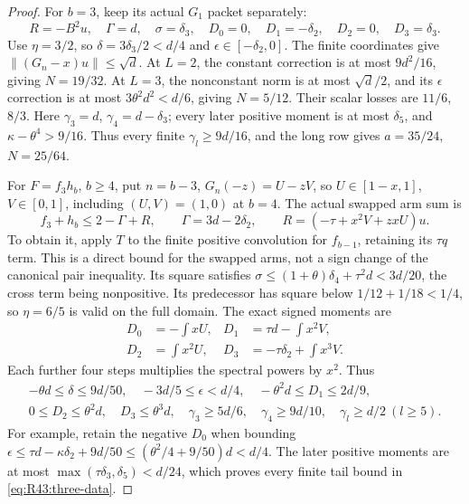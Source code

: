 \begin{proof}
For \(b=3\), keep its actual \(G_1\) packet separately:
\[
 R=-B^2u,\quad\Gamma=d,\quad
 \sigma=\delta_3,\quad D_0=0,\quad D_1=-\delta_2,\quad
 D_2=0,\quad D_3=\delta_3.
\]
Use \(\eta=3/2\), so \(\delta=3\delta_3/2<d/4\) and
\(\epsilon\in[-\delta_2,0]\).
The finite coordinates give \(\|(G_n-x)u\|\le\sqrt d\).
At \(L=2\), the constant correction is at most \(9d^2/16\),
giving \(N=19/32\). At \(L=3\), the nonconstant norm is at most
\(\sqrt d/2\), and its \(\epsilon\) correction is at most
\(3\theta^2d^2<d/6\), giving \(N=5/12\).
Their scalar losses are \(11/6\), \(8/3\).
Here \(\gamma_3=d\), \(\gamma_4=d-\delta_3\); every later
positive moment is at most \(\delta_5\), and
\(\kappa-\theta^4>9/16\). Thus every finite
\(\gamma_l\ge9d/16\), and the long row gives
\(a=35/24\), \(N=25/64\).

For \(F=f_3h_b\), \(b\ge4\), put \(n=b-3\),
\(G_n(-z)=U-zV\), so \(U\in[1-x,1]\), \(V\in[0,1]\),
including \((U,V)=(1,0)\) at \(b=4\). The actual swapped arm sum is
\[
 f_3+h_b\le2-\Gamma+R,\qquad
 \Gamma=3d-2\delta_2,\qquad R=(-\tau+x^2V+zxU)u.
\]
To obtain it, apply \(T\) to the finite positive convolution for
\(f_{b-1}\), retaining its \(\tau q\) term. This is a direct bound
for the swapped arms, not a sign change of the canonical pair inequality.
Its square satisfies
\(\sigma\le(1+\theta)\delta_4+\tau^2d<3d/20\), the cross term
being nonpositive. Its predecessor has square below
\(1/12+1/18<1/4\), so \(\eta=6/5\) is valid on the full domain.
The exact signed moments are
\[
 \begin{aligned}
 D_0&=-\int xU,&D_1&=\tau d-\int x^2V,\\
 D_2&=\int x^2U,&D_3&=-\tau\delta_2+\int x^3V.
 \end{aligned}
\]
Each further four steps multiplies the spectral powers by \(x^2\).
Thus
\begin{equation}\label{eq:R43:three-data}
\begin{gathered}
 -\theta d\le\delta\le9d/50,\quad
 -3d/5\le\epsilon<d/4,\quad
 -\theta^2d\le D_1\le2d/9,\\
 0\le D_2\le\theta^2d,\quad D_3\le\theta^3d,\quad
 \gamma_3\ge5d/6,\quad\gamma_4\ge9d/10,\quad
 \gamma_l\ge d/2\ (l\ge5).
\end{gathered}
\end{equation}
For example, retain the negative \(D_0\) when bounding
\(\epsilon\le\tau d-\kappa\delta_2+9d/50
\le(\theta^2/4+9/50)d<d/4\).
The later positive moments are at most
\(\max(\tau\delta_3,\delta_5)<d/24\), which proves every
finite tail bound in \eqref{eq:R43:three-data}.


\end{proof}
